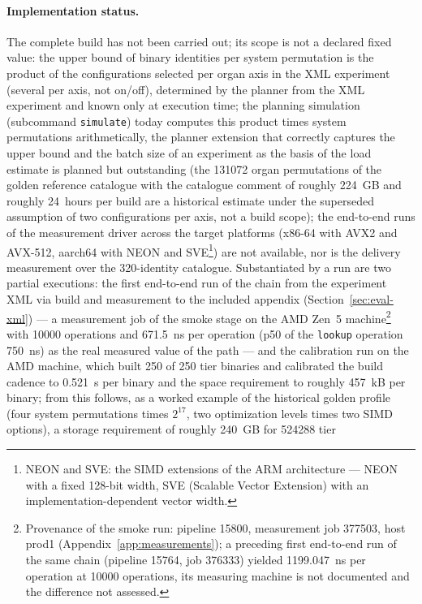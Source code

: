 \begin{nurlang}
\paragraph{Implementation status.} The complete build has not been carried out; its scope is not a
declared fixed value: the upper bound of binary identities per system permutation is the product of the
configurations selected per organ axis in the XML experiment (several per axis, not on/off), determined by
the planner from the XML experiment and known only at execution time; the planning simulation (subcommand
\texttt{simulate}) today computes this product times system permutations arithmetically, the planner
extension that correctly captures the upper bound and the batch size of an experiment as the basis of the
load estimate is planned but outstanding (the 131072 organ permutations of the golden reference catalogue
with the catalogue comment of roughly 224~GB and roughly 24~hours per build are a historical estimate under
the superseded assumption of two configurations per axis, not a build scope); the end-to-end runs of the measurement driver across the target platforms (x86-64
with AVX2 and AVX-512, aarch64 with NEON and SVE\footnote{NEON and SVE\@: the SIMD extensions of
the ARM architecture --- NEON with a fixed 128-bit width, SVE (Scalable Vector Extension) with an
implementation-dependent vector width.}) are not available, nor is the delivery measurement over
the 320-identity catalogue. Substantiated by a run are two partial executions: the first
end-to-end run of the chain from the experiment XML via build and measurement to the included
appendix (Section~\ref{sec:eval-xml}) --- a measurement job of the smoke stage on the AMD Zen~5
machine\footnote{Provenance of the smoke run: pipeline 15800, measurement job 377503, host prod1
(Appendix~\ref{app:measurements}); a preceding first end-to-end run of the same chain (pipeline
15764, job 376333) yielded 1199.047~ns per operation at 10000 operations, its measuring machine is
not documented and the difference not assessed.} with 10000 operations and 671.5~ns per operation
(p50 of the \texttt{lookup} operation 750~ns) as the real measured value of the path --- and the
calibration run on the AMD machine, which built 250 of 250 tier binaries and calibrated the build
cadence to 0.521~s per binary and the space requirement to roughly 457~kB per binary; from this
follows, as a worked example of the historical golden profile (four system permutations times $2^{17}$, two
optimization levels times two SIMD options), a storage requirement of roughly 240~GB for 524288 tier

\end{nurlang}
